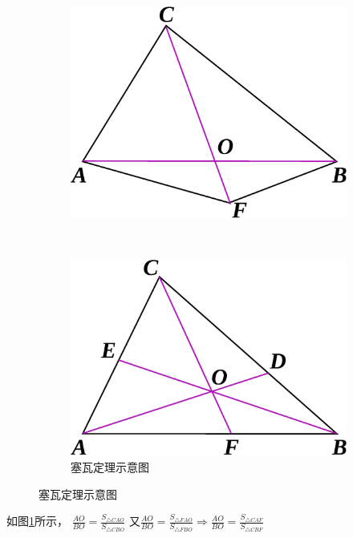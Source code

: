 \documentclass[12pt]{article}
\begin{document}
\begin{enumerate}
\begin{figure}[!ht]
\begin{subfigure}[b]{0.31\textwidth}
    \includegraphics[width=\textwidth]{area_principle.eps}
    \caption{}\label{fig:area_principle}
    \end{subfigure}~
    \begin{subfigure}[b]{0.31\textwidth}
    \includegraphics[width=\textwidth]{Cevas_theorem_1.eps}
    \caption{塞瓦定理示意图}\label{fig:Cevas_theorem_1}
    \end{subfigure}
    \end{figure}

如图\ref{fig:area_principle}所示， $\frac{AO}{BO}=\frac{S_{\triangle CAO}}{S_{\triangle CBO}}$
又$\frac{AO}{BO}=\frac{S_{\triangle FAO}}{S_{\triangle FBO}} \Rightarrow\frac{AO}{BO}=\frac{S_{\triangle CAF}}{S_{\triangle CBF}}$



\end{enumerate}
\end{document}
